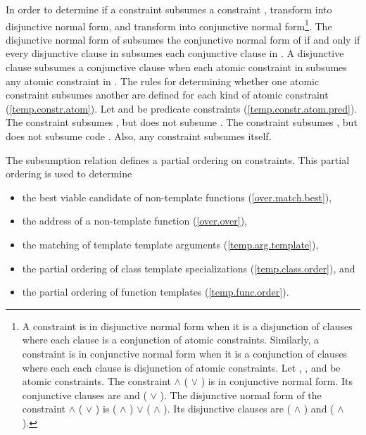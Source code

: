 \pnum
In order to determine if a constraint  subsumes a constraint
, transform  into disjunctive normal form, 
and transform  into conjunctive normal form\footnote{
A constraint is in disjunctive normal form when it is a disjunction of
clauses where each clause is a conjunction of atomic constraints. 
% 
Similarly, a constraint is in conjunctive normal form when it is a conjunction 
of clauses where each each clause is disjunction of atomic constraints.
\enterexample
Let , , and  be atomic
constraints. 
% 
The constraint  $\land$ ( $\lor$ ) is in 
conjunctive normal form.
% 
Its conjunctive clauses are  and ( $\lor$ ).
% 
The disjunctive normal form of the constraint
 $\land$ ( $\lor$ ) 
is
( $\land$ ) $\lor$ ( $\land$ ).
% 
Its disjunctive clauses are ( $\land$ ) and 
( $\land$ ).
\exitexample
}.
% 
The disjunctive normal form of  subsumes the conjunctive normal 
form of  if and only if every disjunctive clause in  
subsumes each conjunctive clause in .
% 
A disjunctive clause  subsumes a conjunctive clause
 when each atomic constraint in  subsumes any atomic 
constraint in .
% 
The rules for determining whether one atomic constraint subsumes
another are defined for each kind of atomic constraint
(\ref{temp.constr.atom}).
% 
\enterexample
Let  and  be
predicate constraints (\ref{temp.constr.atom.pred}).
% 
The constraint  subsumes , 
but  does not subsume . 
% 
The constraint  subsumes , but
 does not subsume code . 
% 
Also, any constraint  subsumes itself.
\exitexample


\pnum
The subsumption relation defines a partial ordering on constraints. 
This partial ordering is used to determine
% 
\begin{itemize}
\item the best viable candidate of non-template functions
     (\ref{over.match.best}), 
\item the address of a non-template function
     (\ref{over.over}), 
\item the matching of template template arguments
     (\ref{temp.arg.template}), 
\item the partial ordering of class template specializations
     (\ref{temp.class.order}), and
\item the partial ordering of function templates
     (\ref{temp.func.order}).
\end{itemize}

